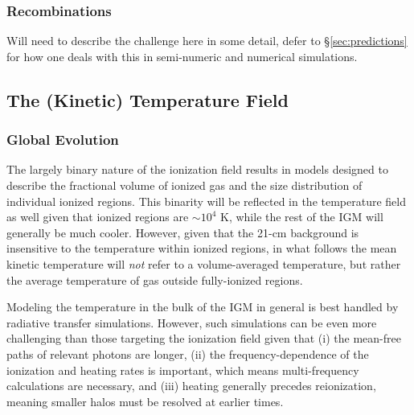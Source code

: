 \subsubsection{Recombinations}
{\color{red} Will need to describe the challenge here in some detail, defer to \S\ref{sec:predictions} for how one deals with this in semi-numeric and numerical simulations.}

% 


\subsection{The (Kinetic) Temperature Field}

\subsubsection{Global Evolution} \label{sec:temperature_global}
The largely binary nature of the ionization field results in models designed to describe the fractional volume of ionized gas and the size distribution of individual ionized regions. This binarity will be reflected in the temperature field as well given that ionized regions are $\sim 10^4$ K, while the rest of the IGM will generally be much cooler. However, given that the 21-cm background is insensitive to the temperature within ionized regions, in what follows the mean kinetic temperature will \textit{not} refer to a volume-averaged temperature, but rather the average temperature of gas outside fully-ionized regions. 

Modeling the temperature in the bulk of the IGM in general is best handled by radiative transfer simulations. However, such simulations can be even more challenging than those targeting the ionization field given that (i) the mean-free paths of relevant photons are longer, (ii) the frequency-dependence of the ionization and heating rates is important, which means multi-frequency calculations are necessary, and (iii) heating generally precedes reionization, meaning smaller halos must be resolved at earlier times. 

